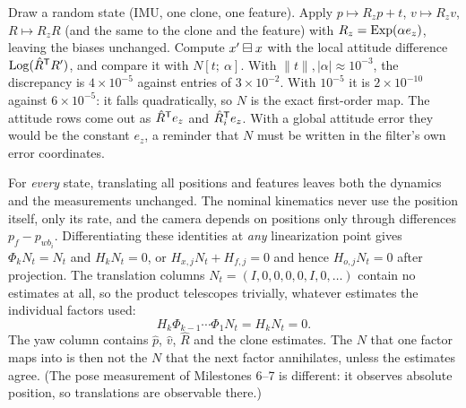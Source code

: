 \begin{solutions}
  \item Draw a random state (IMU, one clone, one feature). Apply $p \mapsto R_zp + t$, $v \mapsto R_zv$, $R \mapsto R_zR$ (and the same to the clone and the feature) with $R_z = \operatorname{Exp}(\alpha e_z)$,
        leaving the biases unchanged. Compute $x'\boxminus x$ with the local attitude difference $\operatorname{Log}(\hat R^{\mathsf{T}} R')$, and compare it with $N[t;\ \alpha]$. With $\|t\|, |\alpha| \approx 10^{-3}$, the
        discrepancy is $4\times10^{-5}$ against entries of $3\times10^{-2}$. With $10^{-5}$ it is $2\times10^{-10}$ against $6\times10^{-5}$: it falls quadratically, so $N$ is the exact first-order map. The
        attitude rows come out as $\hat R^{\mathsf{T}} e_z$ and $\hat R_i^{\mathsf{T}} e_z$. With a global attitude error they would be the constant $e_z$, a reminder that $N$ must be written in the
        filter's own error coordinates.

  \item For \emph{every} state, translating all positions and features leaves both the dynamics and the measurements unchanged. The nominal kinematics never use
        the position itself, only its rate, and the camera depends on positions only through differences $p_f - p_{wb_i}$. Differentiating these identities
        at \emph{any} linearization point gives $\Phi_kN_t = N_t$ and $H_kN_t = 0$, or $H_{x,j}N_t + H_{f,j} = 0$ and hence $H_{o,j}N_t = 0$ after projection. The translation columns
        $N_t = (I, 0, 0, 0, 0, I, 0, \dots)$ contain no estimates at all, so the product telescopes trivially, whatever estimates the individual factors used:
        \[
          H_k\Phi_{k-1}\cdots\Phi_1N_t = H_kN_t = 0 .
        \]
        The yaw column contains $\hat p$, $\hat v$, $\hat R$ and the clone estimates. The $N$ that one factor maps into is then not the $N$ that the next factor annihilates, unless the
        estimates agree. (The pose measurement of Milestones 6--7 is different: it observes absolute position, so translations are observable there.)


\end{solutions}
